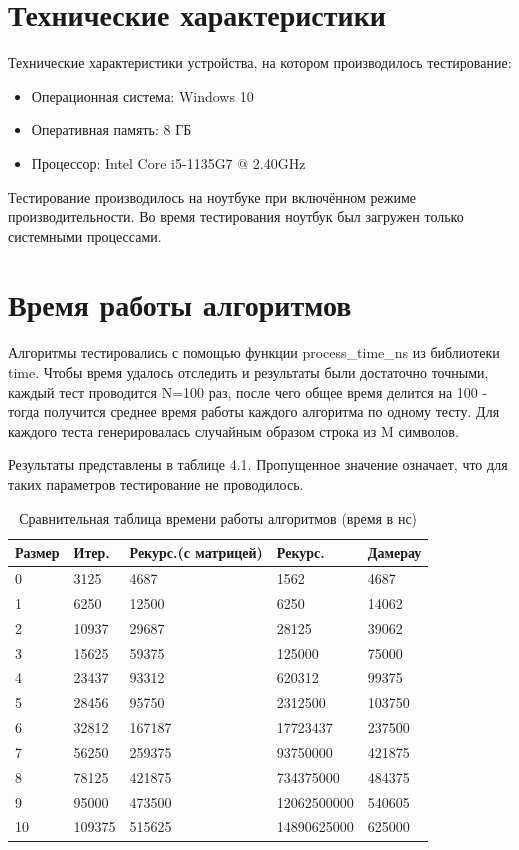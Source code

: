 \section{Технические характеристики}
Технические характеристики устройства, на котором производилось тестирование:
\begin{itemize}
    \item Операционная система: Windows 10
    \item Оперативная память: 8 ГБ
    \item Процессор: Intel Core i5-1135G7 @ 2.40GHz
\end{itemize}

Тестирование производилось на ноутбуке при включённом режиме производительности. Во время тестирования ноутбук был загружен только системными процессами.

\section{Время работы алгоритмов}
Алгоритмы тестировались с помощью функции process\_time\_ns из библиотеки time. Чтобы время удалось отследить и результаты были достаточно точными, каждый тест проводится N=100 раз, после чего общее время делится на 100 - тогда получится среднее время работы каждого алгоритма по одному тесту. Для каждого теста генерировалась случайным образом строка из M символов.

Результаты представлены в таблице 4.1. Пропущенное значение означает, что для таких параметров тестирование не проводилось.

\begin{table}[!ht]
  \caption{Сравнительная таблица времени работы алгоритмов (время в нс)}
  \centering
\begin{tabular}{ | l | l | l | l | l |}
\hline
Размер & Итер. & Рекурс.(с матрицей)  & Рекурс. & Дамерау \\ \hline
0 & 3125 & 4687 & 1562 & 4687\\
1 & 6250 & 12500 & 6250 & 14062 \\
2 & 10937 & 29687 & 28125 & 39062 \\
3 & 15625 & 59375 & 125000 & 75000\\ 
4 & 23437 & 93312 & 620312 & 99375 \\
5 & 28456 & 95750 & 2312500 & 103750 \\
6 & 32812 & 167187 & 17723437 & 237500\\ 
7 & 56250 & 259375 & 93750000 & 421875\\
8 & 78125 & 421875 & 734375000 & 484375\\
9 & 95000 & 473500 & 12062500000 & 540605\\
10 & 109375 & 515625 & 14890625000 & 625000\\
\hline
\end{tabular}
\end{table}
\clearpage


